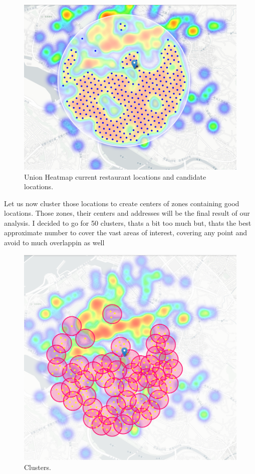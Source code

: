 \documentclass[11pt]{article}
\begin{document}
\begin{figure}[H]
    \centering
        \includegraphics[scale=.4]{figures/cm9.png}
    \caption{ Union Heatmap current restaurant locations and candidate locations.}
    \label{fig:1}
\end{figure}

Let us now cluster those locations to create centers of zones containing good locations. Those zones, their centers and addresses will be the final result of our analysis. I decided to go for 50 clusters, thats a bit too much but, thats the best approximate number to cover the vast areas of interest, covering any point and avoid to much overlappin as well

\begin{figure}[H]
    \centering
        \includegraphics[scale=.4]{figures/cm10.png}
    \caption{ Clusters.}
    \label{fig:1}
\end{figure}
\end{document}
